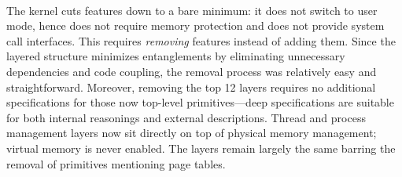 \paragraph{\mCTOSembed{}}
The \mCTOSembed{} kernel cuts features down to a bare minimum: it does
not switch to user mode, hence does not require memory protection and
does not provide system call interfaces.  This requires \emph{removing}
features instead of adding them.  Since the layered structure minimizes
entanglements by eliminating unnecessary dependencies and code coupling,
the removal process was relatively easy and straightforward.
Moreover, removing the top 12 layers requires no additional
specifications for those now top-level primitives---deep specifications
are suitable for both internal reasonings and external descriptions.  Thread and process
management layers now sit directly on top of physical memory
management; virtual memory is never enabled.  The
layers remain largely the same barring the removal of primitives
mentioning page tables.


